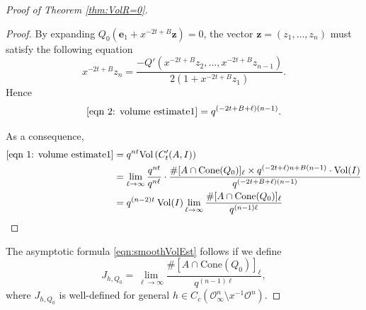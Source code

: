 \documentclass[11pt,a4paper,reqno]{amsart}
\def\vol{\mathrm{Vol}}
\newcommand{\Cone}{\mathrm{Cone}}
\theoremstyle{definition}
\theoremstyle{remark}
\numberwithin{equation}{section}
\begin{document}
\begin{proof}[Proof of Theorem \ref{thm:VolR=0}]
\begin{proof}
By expanding $Q_0( \mathbf e_1+x^{-2t+B}\mathbf z)=0$, the vector $\mathbf z=(z_1, \ldots, z_n)$ must satisfy the following equation 
\[
x^{-2t+B}z_n=\frac {-Q'(x^{-2t+B}z_2, \ldots,x^{-2t+B}z_{n-1})}{2(1+x^{-2t+B}z_1)}.
\]
Hence 
\[
\eqref{eqn 2: volume estimate1}=q^{(-2t+B+\ell)(n-1)}.
\]

As a consequence, 
\[\begin{split}
\eqref{eqn 1: volume estimate1}
&=q^{nt}\vol\left(C'_t(A,I)\right)\\
&=\lim_{\ell\rightarrow \infty}\frac {q^{nt}}{q^{n\ell}}\cdot \frac{\#[A\cap \Cone(Q_0)]_\ell\times q^{(-2t+\ell)n+B(n-1)}\cdot \vol(I)}{q^{(-2t+B+\ell)(n-1)}}\\
&=q^{(n-2)t}\: \vol(I)\lim_{\ell\rightarrow \infty} \frac {\#[A\cap \Cone(Q_0)]_\ell}{q^{(n-1)\ell}}
\end{split}\]
\end{proof}
The asymptotic formula \eqref{eqn:smoothVolEst} follows if we define
\[
J_{h,Q_0}=\lim_{\ell\rightarrow \infty} \frac {\#[A\cap \Cone(Q_0)]_\ell}{q^{(n-1)\ell}},
\]
where $J_{h,Q_0}$ is well-defined for general $h\in C_c(\mathcal O^n_\infty\setminus x^{-1}\mathcal O^n)$.
\end{proof}
\end{document}
